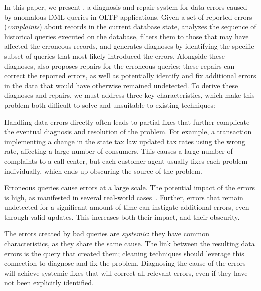 In this paper, we present \sys, a diagnosis and repair system for data
errors caused by anomalous DML queries in OLTP applications. Given a
set of reported errors (\emph{complaints}) about records in the current database state, \sys
analyzes the sequence of historical queries executed on the database, 
filters them to those that may have affected the erroneous records,  and
generates diagnoses by identifying the specific subset of queries that
most likely introduced the errors. Alongside these diagnoses, \sys also
proposes repairs for the erroneous queries; these repairs can correct the
reported errors, as well as potentially identify and fix 
additional errors in the data that would have otherwise remained
undetected. To derive these diagnoses and repairs, we must address three
key characteristics, which make this problem both difficult to solve
and unsuitable to existing techniques:
\begin{description}[leftmargin=*, topsep=0mm, itemsep=0mm, parsep=1mm]
\item[Obscurity.] Handling data errors directly often leads to partial
fixes that further complicate the eventual diagnosis and resolution of
the problem. For example, a transaction implementing a change in the
state tax law updated tax rates using the wrong rate, affecting a
large number of consumers. This causes a large number of complaints to
a call center, but each customer agent usually fixes each problem
individually, which ends up obscuring the source of the problem.

\item[Large impact.] Erroneous queries cause errors at a large scale.
The potential impact of the errors is high, as manifested in several
real-world cases~\cite{Yates10, Grady13, sakalerrors}. Further, errors
that remain undetected for a significant amount of time can instigate
additional errors, even through valid updates. This increases both
their impact, and their obscurity.

\item[Systemic errors.] The errors created by bad queries are
\emph{systemic}: they have common characteristics, as they share the
same cause. The link between the resulting data errors is the query
that created them; cleaning techniques should leverage this connection
to diagnose and fix the problem. Diagnosing the cause of the errors
will achieve systemic fixes that will correct all relevant errors,
even if they have not been explicitly identified. 

\end{description}

